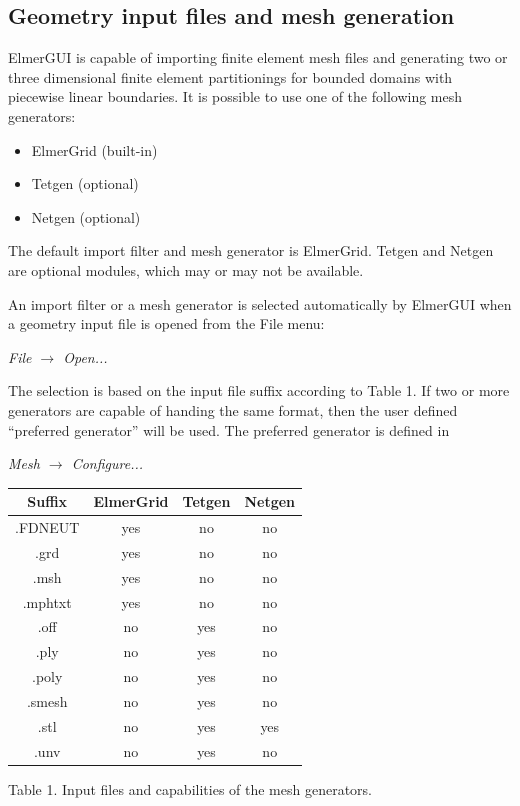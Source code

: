 \documentclass[a4paper,12pt]{article}
\newcommand{\menu}[2]{{\it \vskip2mm #1 $\rightarrow$ #2 \vskip2mm}}
\begin{document}
\subsection{Geometry input files and mesh generation}

ElmerGUI is capable of importing finite element mesh files and generating two or three
dimensional finite element partitionings for bounded domains with piecewise linear
boundaries. It is possible to use one of the following mesh generators:
\begin{itemize}
 \item ElmerGrid (built-in)
 \item Tetgen (optional)
 \item Netgen (optional)
\end{itemize}
The default import filter and mesh generator is ElmerGrid. Tetgen and Netgen are optional
modules, which may or may not be available.

An import filter or a mesh generator is selected automatically by ElmerGUI when a geometry
input file is opened from the File menu:

\menu{File}{Open...}

The selection is based on the input file suffix according to Table 1. If two or more
generators are capable of handing the same format, then the user defined ``preferred
generator'' will be used. The preferred generator is defined in

\menu{Mesh}{Configure...}

\begin{center}
\begin{tabular}{|c|c|c|c|}
\hline
 Suffix & ElmerGrid & Tetgen & Netgen \\
\hline 
.FDNEUT & yes & no & no \\
.grd  & yes & no & no \\
.msh & yes & no & no \\
.mphtxt & yes & no & no \\
.off & no & yes & no \\
.ply & no & yes & no \\
.poly & no & yes & no \\
.smesh & no & yes & no \\
.stl  & no & yes & yes \\
.unv & no & yes & no \\
\hline
\end{tabular}
\vskip5mm
Table 1. Input files and capabilities of the mesh generators.
\end{center}
\end{document}
